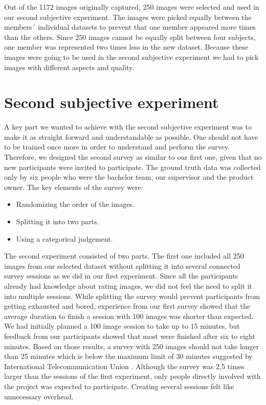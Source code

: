 Out of the 1172 images originally captured, 250 images were selected and used in our second subjective experiment. The images were picked equally between the members´ individual datasets to prevent that one member appeared more times than the others. Since 250 images cannot be equally split between four subjects, one member was represented two times less in the new dataset. Because these images were going to be used in the second subjective experiment we had to pick images with different aspects and quality. 


\section{Second subjective experiment}
\label{sec:secondse}
A key part we wanted to achieve with the second subjective experiment was to make it as straight forward and understandable as possible. One should not have to be trained once more in order to understand and perform the survey. Therefore, we designed the second survey as similar to our first one, given that no new participants were invited to participate. The ground truth data was collected only by six people who were the bachelor team, our supervisor and the product owner. The key elements of the survey were: 
\begin{itemize}
    \item Randomizing the order of the images.
    \item Splitting it into two parts. 
    \item Using a categorical judgement.
\end{itemize}

The second experiment consisted of two parts. The first one included all 250 images from our selected dataset without splitting it into several connected survey sessions as we did in our first experiment. Since all the participants already had knowledge about rating images, we did not feel the need to split it into multiple sessions. While splitting the survey would prevent participants from getting exhausted and bored, experience from our first survey showed that the average duration to finish a session with 100 images was shorter than expected. We had initially planned a 100 image session to take up to 15 minutes, but feedback from our participants showed that most were finished after six to eight minutes. Based on those results, a survey with 250 images should not take longer than 25 minutes which is below the maximum limit of 30 minutes suggested by International Telecommunication Union \cite{methodologySubjective}. Although the survey was 2,5 times larger than the sessions of the first experiment, only people directly involved with the project was expected to participate. Creating several sessions felt like unnecessary overhead. 

